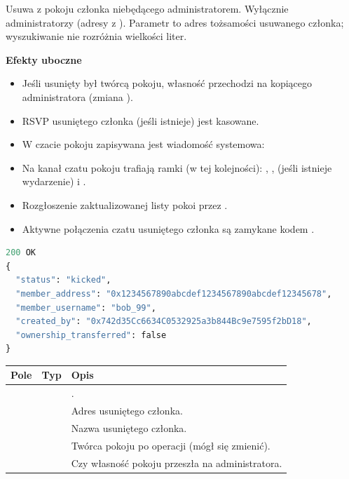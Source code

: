 Usuwa z pokoju członka niebędącego administratorem. Wyłącznie administratorzy (adresy z
). Parametr  to adres tożsamości usuwanego członka;
wyszukiwanie nie rozróżnia wielkości liter.

\textbf{Efekty uboczne}
\begin{itemize}[nosep]
  \item Jeśli usunięty był twórcą pokoju, własność przechodzi na kopiącego administratora (zmiana ).
  \item RSVP usuniętego członka (jeśli istnieje) jest kasowane.
  \item W czacie pokoju zapisywana jest wiadomość systemowa: 
  \item Na kanał czatu pokoju trafiają ramki (w tej kolejności): , ,  (jeśli istnieje wydarzenie) i .
  \item Rozgłoszenie zaktualizowanej listy pokoi przez .
  \item Aktywne połączenia czatu usuniętego członka są zamykane kodem .
\end{itemize}

\begin{lstlisting}[language=Python]
200 OK
{
  "status": "kicked",
  "member_address": "0x1234567890abcdef1234567890abcdef12345678",
  "member_username": "bob_99",
  "created_by": "0x742d35Cc6634C0532925a3b844Bc9e7595f2bD18",
  "ownership_transferred": false
}
\end{lstlisting}

\begin{tabularx}{\textwidth}{llY}
\toprule
Pole & Typ & Opis \\
\midrule
{} &  & . \\
 &  & Adres usuniętego członka. \\
 &  & Nazwa usuniętego członka. \\
 &  & Twórca pokoju po operacji (mógł się zmienić). \\
 &  & Czy własność pokoju przeszła na administratora. \\
\bottomrule
\end{tabularx}

